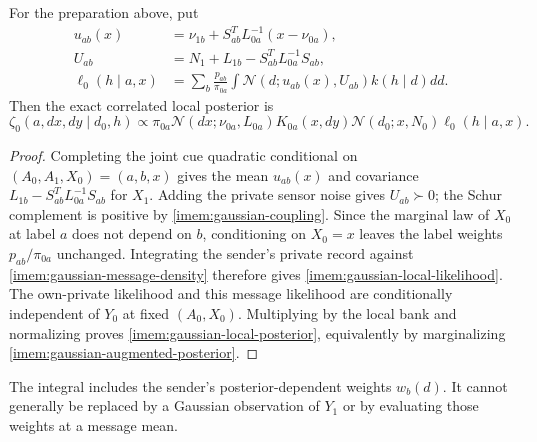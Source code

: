 For the preparation above, put
\begin{equation}
 \begin{aligned}
 u_{ab}(x)&=\nu_{1b}+S_{ab}^TL_{0a}^{-1}(x-\nu_{0a}),\\
 U_{ab}&=N_1+L_{1b}-S_{ab}^TL_{0a}^{-1}S_{ab},\\
 \ell_0(h\mid a,x)&=\sum_b\frac{p_{ab}}{\pi_{0a}}
 \int\mathcal N(d;u_{ab}(x),U_{ab})k(h\mid d)dd.
 \end{aligned}
 \label{imem:gaussian-local-likelihood}
\end{equation}
Then the exact correlated local posterior is
\begin{equation}
 \zeta_0(a,dx,dy\mid d_0,h)
 \propto\pi_{0a}\mathcal N(dx;\nu_{0a},L_{0a})K_{0a}(x,dy)
 \mathcal N(d_0;x,N_0)\ell_0(h\mid a,x).
 \label{imem:gaussian-local-posterior}
\end{equation}
\begin{proof}
Completing the joint cue quadratic conditional on $(A_0,A_1,X_0)=(a,b,x)$ gives the mean $u_{ab}(x)$ and covariance $L_{1b}-S_{ab}^TL_{0a}^{-1}S_{ab}$ for $X_1$. Adding the private sensor noise gives $U_{ab}\succ0$; the Schur complement is positive by \cref{imem:gaussian-coupling}. Since the marginal law of $X_0$ at label $a$ does not depend on $b$, conditioning on $X_0=x$ leaves the label weights $p_{ab}/\pi_{0a}$ unchanged. Integrating the sender's private record against \cref{imem:gaussian-message-density} therefore gives \cref{imem:gaussian-local-likelihood}. The own-private likelihood and this message likelihood are conditionally independent of $Y_0$ at fixed $(A_0,X_0)$. Multiplying by the local bank and normalizing proves \cref{imem:gaussian-local-posterior}, equivalently by marginalizing \cref{imem:gaussian-augmented-posterior}.
\end{proof}

The integral includes the sender's posterior-dependent weights $w_b(d)$. It cannot generally be replaced by a Gaussian observation of $Y_1$ or by evaluating those weights at a message mean.


